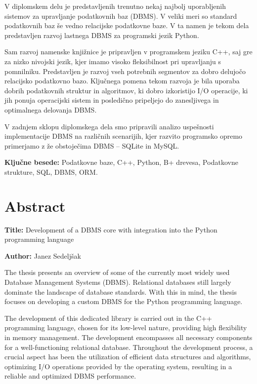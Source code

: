 \documentclass[a4paper,12pt,openright]{book}
\newcommand{\ttitleEn}{Development of a DBMS core with integration into the Python programming language}
\newcommand{\tauthor}{Janez Sedeljšak}
\newcommand{\tkeywords}{Podatkovne baze, C++, Python, B+ drevesa, Podatkovne strukture, SQL, DBMS, ORM}
\newcommand{\clearemptydoublepage}{\newpage{\pagestyle{empty}\cleardoublepage}}
\begin{document}
\noindent V diplomskem delu je predstavljenih trenutno nekaj najbolj uporabljenih sistemov za upravljanje podatkovnih baz (DBMS). V veliki meri so standard podatkovnih baz še vedno relacijske podatkovne baze. V ta namen je tekom dela predstavljen razvoj lastnega DBMS za programski jezik Python.

Sam razvoj namenske knjižnice je pripravljen v programskem jeziku C++, saj gre za nizko nivojski jezik, kjer imamo visoko fleksibilnost pri upravljanju s pomnilniku. Predstavljen je razvoj vseh potrebnih segmentov za dobro delujočo relacijsko podatkovno bazo. Ključnega pomena tekom razvoja je bila uporaba dobrih podatkovnih struktur in algoritmov, ki dobro izkoristijo I/O operacije, ki jih ponuja operacijski sistem in posledično pripeljejo do zanesljivega in optimalnega delovanja DBMS.

V zadnjem sklopu diplomskega dela smo pripravili analizo uspešnosti implementacije DBMS na različnih scenarijih, kjer razvito programsko opremo primerjamo z že obstoječima DBMS – SQLite in MySQL.
\bigskip

\noindent\textbf{Ključne besede:} \tkeywords.
\clearemptydoublepage

{}
\chapter*{Abstract}

\noindent\textbf{Title:} \ttitleEn
\bigskip

\noindent\textbf{Author:} \tauthor
\bigskip

\noindent The thesis presents an overview of some of the currently most widely used Database Management Systems (DBMS). Relational databases still largely dominate the landscape of database standards. With this in mind, the thesis focuses on developing a custom DBMS for the Python programming language.

The development of this dedicated library is carried out in the C++ programming language, chosen for its low-level nature, providing high flexibility in memory management. The development encompasses all necessary components for a well-functioning relational database. Throughout the development process, a crucial aspect has been the utilization of efficient data structures and algorithms, optimizing I/O operations provided by the operating system, resulting in a reliable and optimized DBMS performance.
\end{document}
